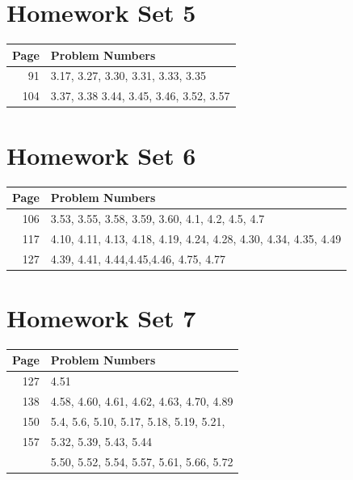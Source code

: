 \documentclass{book}
\begin{document}
\section{Homework Set 5}
\begin{tabular}{r|l}
Page & Problem Numbers\\
\hline
91 & 3.17, 3.27, 3.30, 3.31, 3.33, 3.35\\
104 & 3.37, 3.38 3.44, 3.45, 3.46, 3.52, 3.57\\
\end{tabular}

\section{Homework Set 6}
\begin{tabular}{r|l}
Page & Problem Numbers\\
\hline
106 & 3.53, 3.55, 3.58, 3.59, 3.60, 4.1, 4.2, 4.5, 4.7\\
117 & 4.10, 4.11, 4.13, 4.18, 4.19, 4.24, 4.28, 4.30, 4.34, 4.35, 4.49\\
127 & 4.39, 4.41, 4.44,4.45,4.46, 4.75, 4.77\\
\end{tabular}

\section{Homework Set 7}
\begin{tabular}{r|l}
Page & Problem Numbers\\
\hline
127 & 4.51\\
138 & 4.58, 4.60, 4.61, 4.62, 4.63, 4.70, 4.89\\
150 & 5.4, 5.6, 5.10, 5.17, 5.18, 5.19, 5.21,\\
157 & 5.32, 5.39, 5.43, 5.44\\
& 5.50, 5.52, 5.54, 5.57, 5.61, 5.66, 5.72\\
\end{tabular}


\newpage
\nocite{textbook}
\printbibliography
\end{document}
